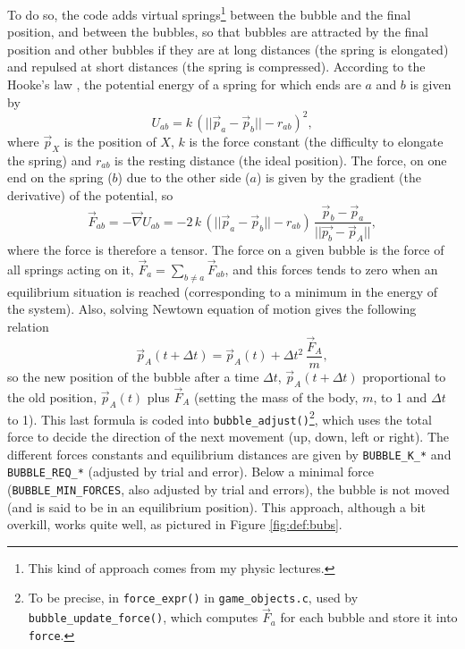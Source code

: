 \documentclass[12pt,a4paper]{article}
\newcommand{\cc}[1]{\texttt{#1}}
\begin{document}
To do so, the code adds virtual springs\footnote{This kind of approach comes from my physic lectures.} between the bubble and the final position, and between the bubbles, so that bubbles are attracted by the final position and other bubbles if they are at long distances (the spring is elongated) and repulsed at short distances (the spring is compressed). According to the Hooke's law \cite{hooke}, the potential energy of a spring for which ends are $a$ and $b$ is given by\begin{equation}
U_{ab} = k\,(||\vec{p}_a-\vec{p}_b||-r_{ab})^2,
\end{equation}
where $\vec{p}_X$ is the position of $X$, $k$ is the force constant (the difficulty to elongate the spring) and $r_{ab}$ is the resting distance (the ideal position). The force, on one end on the spring ($b$) due to the other side ($a$) is given by the gradient (the derivative) of the potential, so\begin{equation}
\vec{F}_{ab}  = - \vec{\nabla} U_{ab} =  -2\,k\,(||\vec{p}_a-\vec{p}_b||-r_{ab})\,\frac{\vec{p}_b-\vec{p}_a}{||\vec{p_b}-\vec{p}_A||},
\end{equation}
where the force is therefore a tensor. The force on a given bubble is the force of all springs acting on it, $\vec{F}_a = \sum_{b\neq a} \vec{F}_{ab}$, and this forces tends to zero when an equilibrium situation is reached (corresponding to a minimum in the energy of the system). Also, solving Newtown equation of motion gives the following relation\begin{equation}
\vec{p}_A(t+\Delta{t}) = \vec{p}_A(t) + \Delta{t}^2\,\frac{\vec{F}_A}{m},\label{eq:1}
\end{equation}
so the new position of the bubble after a time $\Delta{t}$, $\vec{p}_A(t+\Delta{t})$ proportional to the old position, $\vec{p}_A(t)$ plus $\vec{F}_A$ (setting the mass of the body, $m$, to 1 and $\Delta{t}$ to 1). This last formula is coded into \cc{bubble_adjust()}\footnote{To be precise, in \cc{force_expr()} in \texttt{game\_objects.c}, used by \cc{bubble_update_force()}, which computes $\vec{F}_{a}$ for each bubble and store it into \cc{force}.}, which uses the total force to decide the direction of the next movement (up, down, left or right). The different forces constants and equilibrium distances are given by \cc{BUBBLE_K_*} and \cc{BUBBLE_REQ_*} (adjusted by trial and error). Below a minimal force (\cc{BUBBLE_MIN_FORCES}, also adjusted by trial and errors), the bubble is not moved (and is said to be in an equilibrium position). This approach, although a bit overkill, works quite well, as pictured in Figure \ref{fig:def:bubs}.
\end{document}
